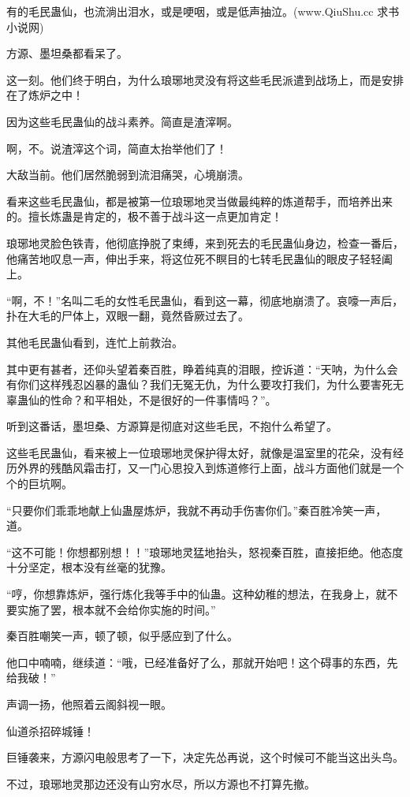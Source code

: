 \begin{this_body}
有的毛民蛊仙，也流淌出泪水，或是哽咽，或是低声抽泣。(www.QiuShu.cc 求书小说网)

方源、墨坦桑都看呆了。

这一刻。他们终于明白，为什么琅琊地灵没有将这些毛民派遣到战场上，而是安排在了炼炉之中！

因为这些毛民蛊仙的战斗素养。简直是渣滓啊。

啊，不。说渣滓这个词，简直太抬举他们了！

大敌当前。他们居然脆弱到流泪痛哭，心境崩溃。

看来这些毛民蛊仙，都是被第一位琅琊地灵当做最纯粹的炼道帮手，而培养出来的。擅长炼蛊是肯定的，极不善于战斗这一点更加肯定！

琅琊地灵脸色铁青，他彻底挣脱了束缚，来到死去的毛民蛊仙身边，检查一番后，他痛苦地叹息一声，伸出手来，将这位死不瞑目的七转毛民蛊仙的眼皮子轻轻阖上。

“啊，不！”名叫二毛的女性毛民蛊仙，看到这一幕，彻底地崩溃了。哀嚎一声后，扑在大毛的尸体上，双眼一翻，竟然昏厥过去了。

其他毛民蛊仙看到，连忙上前救治。

其中更有甚者，还仰头望着秦百胜，睁着纯真的泪眼，控诉道：“天呐，为什么会有你们这样残忍凶暴的蛊仙？我们无冤无仇，为什么要攻打我们，为什么要害死无辜蛊仙的性命？和平相处，不是很好的一件事情吗？”。

听到这番话，墨坦桑、方源算是彻底对这些毛民，不抱什么希望了。

这些毛民蛊仙，看来被上一位琅琊地灵保护得太好，就像是温室里的花朵，没有经历外界的残酷风霜击打，又一门心思投入到炼道修行上面，战斗方面他们就是一个个的巨坑啊。

“只要你们乖乖地献上仙蛊屋炼炉，我就不再动手伤害你们。”秦百胜冷笑一声，道。

“这不可能！你想都别想！！”琅琊地灵猛地抬头，怒视秦百胜，直接拒绝。他态度十分坚定，根本没有丝毫的犹豫。

“哼，你想靠炼炉，强行炼化我等手中的仙蛊。这种幼稚的想法，在我身上，就不要实施了罢，根本就不会给你实施的时间。”

秦百胜嘲笑一声，顿了顿，似乎感应到了什么。

他口中喃喃，继续道：“哦，已经准备好了么，那就开始吧！这个碍事的东西，先给我破！”

声调一扬，他照着云阁斜视一眼。

仙道杀招碎城锤！

巨锤袭来，方源闪电般思考了一下，决定先怂再说，这个时候可不能当这出头鸟。

不过，琅琊地灵那边还没有山穷水尽，所以方源也不打算先撤。


\end{this_body}
